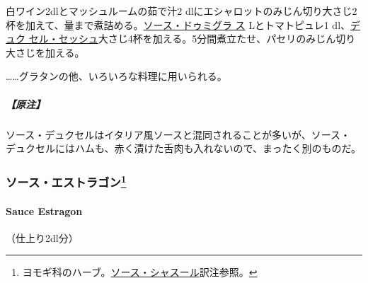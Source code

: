 \begin{recette}

白ワイン2dlとマッシュルームの茹で汁2 dlにエシャロットのみじん切り大さじ2
杯を加えて、\untiers{}量まで煮詰める。\protect\hyperlink{sauce-demi-glace}{ソース・ドゥミグラ
ス}\undemi{} Lとトマトピュレ1\undemi{} dl、\protect\hyperlink{}{デュク
セル・セッシュ}大さじ4杯を加える。5分間煮立たせ、パセリのみじん切り
大さじ\undemi{}を加える。

\ldots{}\ldots{}グラタンの他、いろいろな料理に用いられる。

\hypertarget{ux539fux6ce8-1}{%
\subparagraph{【原注】}\label{ux539fux6ce8-1}}

ソース・デュクセルはイタリア風ソースと混同されることが多いが、ソース・
デュクセルにはハムも、赤く漬けた舌肉も入れないので、まったく別のものだ。

\maeaki

\hypertarget{ux30bdux30fcux30b9ux30a8ux30b9ux30c8ux30e9ux30b4ux30f399}{%
\subsubsection[ソース・エストラゴン]{\texorpdfstring{ソース・エストラゴン\footnote{ヨモギ科のハーブ。\protect\hyperlink{sauce-chasseur}{ソース・シャスール}訳注参照。}}{ソース・エストラゴン}}\label{ux30bdux30fcux30b9ux30a8ux30b9ux30c8ux30e9ux30b4ux30f399}}

\hypertarget{sauce-estragon}{%
\paragraph{Sauce Estragon}\label{sauce-estragon}}


（仕上り2\undemi{}dl分）


\end{recette}
